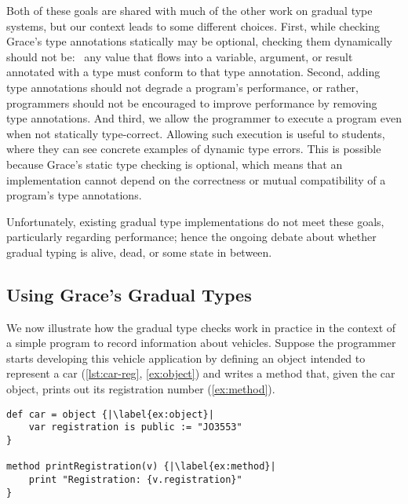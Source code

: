 Both of these goals are shared with
much of the other work on gradual type systems,
but our context leads to some different choices.
First,
while checking Grace's type annotations statically may be optional,
checking them dynamically should not be:%
~any value that flows into a variable, argument, or result
annotated with a type must conform to that type annotation.
Second, 
adding type annotations should not degrade a program's performance,
or rather, programmers should not be encouraged to
improve performance by removing type annotations.
And third, 
we allow the programmer to execute a program even when not statically type-correct.
Allowing such execution is useful to students,
where they can see concrete examples of dynamic type errors.
This is possible because Grace's static type checking is optional,
which means that an
implementation cannot depend on the correctness or mutual
compatibility of a program's type
annotations.


Unfortunately, existing gradual type
implementations do not meet these goals, particularly regarding
performance; hence the ongoing debate about whether gradual typing is
alive, dead, or some state
in between\citep{Takikawa2016,Vitousek2017,Muehlboeck2017,Bauman2017,Richards2017,Greenman2018}.


\subsection{Using Grace's Gradual Types}

We now illustrate how the gradual type checks work in practice
in the context of a simple program to record information about vehicles.
Suppose the programmer starts developing this vehicle
application by defining an object intended to represent a car
(\cref{lst:car-reg}, \cref{ex:object}) and writes a method that, given
the car object, prints out its registration number (\cref{ex:method}).
%

\begin{lstlisting}[caption={The start of a simple program for tracking vehicle information.},float=h,label=lst:car-reg,escapechar=|,columns=flexible]
def car = object {|\label{ex:object}|
    var registration is public := "JO3553"
}

method printRegistration(v) {|\label{ex:method}|
    print "Registration: {v.registration}"
}
\end{lstlisting}



